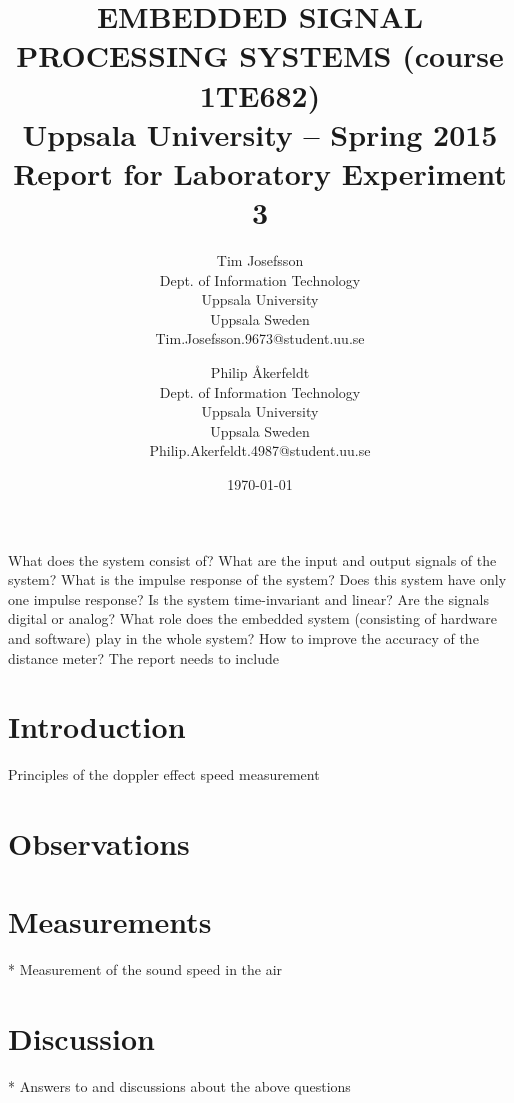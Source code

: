 \documentclass[a4paper,11pt]{article}
\title{\textbf{EMBEDDED SIGNAL PROCESSING SYSTEMS (course 1TE682) \\
    Uppsala University -- Spring 2015 \\
    Report for Laboratory Experiment 3  }}
\author{
Tim Josefsson\\
\textup{Dept. of Information Technology}\\
\textup{Uppsala University}\\
\textup{Uppsala Sweden}\\
\textup{Tim.Josefsson.9673@student.uu.se}
\and
Philip Åkerfeldt\\
\textup{Dept. of Information Technology}\\
\textup{Uppsala University}\\
\textup{Uppsala Sweden}\\
\textup{Philip.Akerfeldt.4987@student.uu.se}
}
\date{\today}
\begin{document}
\maketitle
\newpage
\tableofcontents
\pagebreak

What does the system consist of?
What are the input and output signals of the system?
What is the impulse response of the system?
Does this system have only one impulse response?
Is the system time-invariant and linear?
Are the signals digital or analog?
What role does the embedded system (consisting of hardware and software) play in the whole system?
How to improve the accuracy of the distance meter?
The report needs to include

\section{Introduction}
Principles of the doppler effect speed measurement \\

\section{Observations}

\section{Measurements}
* Measurement of the sound speed in the air \\

\section{Discussion}
* Answers to and discussions about the above questions\\
\end{document}
